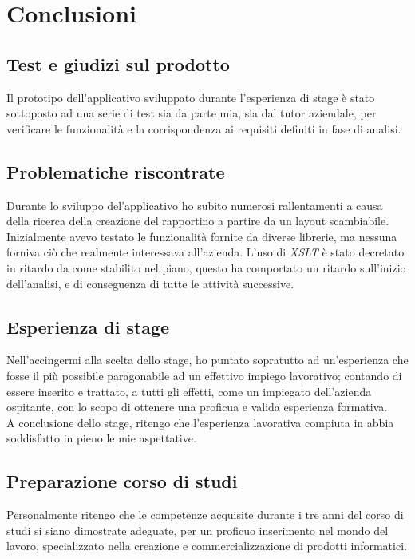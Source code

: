 \newpage
\chapter{Conclusioni}
\label{cap:conclusioni}

\section{Test e giudizi sul prodotto}
Il prototipo dell'applicativo sviluppato durante l'esperienza di stage è stato sottoposto ad una serie di test sia da parte mia, sia dal tutor aziendale, per verificare le funzionalità e la corrispondenza ai requisiti definiti in fase di analisi.
\section{Problematiche riscontrate}
Durante lo sviluppo del'applicativo ho subito numerosi rallentamenti a causa della ricerca della creazione del rapportino a partire da un layout scambiabile. Inizialmente avevo testato le funzionalità fornite da diverse librerie, ma nessuna forniva ciò che realmente interessava all'azienda. L'uso di \textit{XSLT} è stato decretato in ritardo da come stabilito nel piano, questo ha comportato un ritardo sull'inizio dell'analisi, e di conseguenza di tutte le attività successive.  
\section{Esperienza di stage}
Nell'accingermi alla scelta dello stage, ho puntato sopratutto ad un'esperienza che fosse il più possibile paragonabile ad un effettivo impiego lavorativo; contando di essere inserito e trattato, a tutti gli effetti, come un impiegato dell'azienda ospitante, con lo scopo di ottenere una proficua e valida esperienza formativa.
\\
A conclusione dello stage, ritengo che l'esperienza lavorativa compiuta in \asi abbia soddisfatto in pieno le mie aspettative.
\section{Preparazione corso di studi}
Personalmente ritengo che le competenze acquisite durante i tre anni del corso di studi si siano dimostrate adeguate, per un proficuo inserimento nel mondo del lavoro, specializzato nella creazione e commercializzazione di prodotti informatici.

